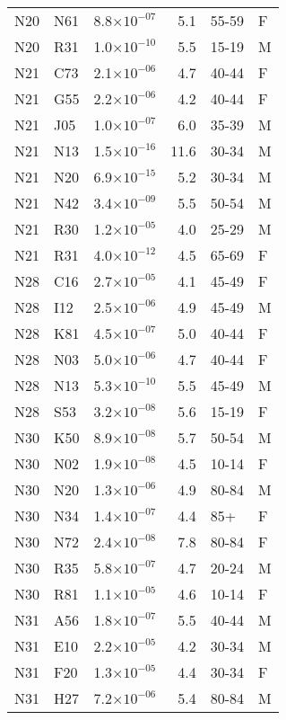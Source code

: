 \begin{longtable}{lllrll}
   N20 & N61 & 8.8$\times10^{-07}$ & 5.1 & 55-59 & F \\ 
   N20 & R31 & 1.0$\times10^{-10}$ & 5.5 & 15-19 & M \\ 
   N21 & C73 & 2.1$\times10^{-06}$ & 4.7 & 40-44 & F \\ 
   N21 & G55 & 2.2$\times10^{-06}$ & 4.2 & 40-44 & F \\ 
   N21 & J05 & 1.0$\times10^{-07}$ & 6.0 & 35-39 & M \\ 
   N21 & N13 & 1.5$\times10^{-16}$ & 11.6 & 30-34 & M \\ 
   N21 & N20 & 6.9$\times10^{-15}$ & 5.2 & 30-34 & M \\ 
   N21 & N42 & 3.4$\times10^{-09}$ & 5.5 & 50-54 & M \\ 
   N21 & R30 & 1.2$\times10^{-05}$ & 4.0 & 25-29 & M \\ 
   N21 & R31 & 4.0$\times10^{-12}$ & 4.5 & 65-69 & F \\ 
   N28 & C16 & 2.7$\times10^{-05}$ & 4.1 & 45-49 & F \\ 
   N28 & I12 & 2.5$\times10^{-06}$ & 4.9 & 45-49 & M \\ 
   N28 & K81 & 4.5$\times10^{-07}$ & 5.0 & 40-44 & F \\ 
   N28 & N03 & 5.0$\times10^{-06}$ & 4.7 & 40-44 & F \\ 
   N28 & N13 & 5.3$\times10^{-10}$ & 5.5 & 45-49 & M \\ 
   N28 & S53 & 3.2$\times10^{-08}$ & 5.6 & 15-19 & F \\ 
   N30 & K50 & 8.9$\times10^{-08}$ & 5.7 & 50-54 & M \\ 
   N30 & N02 & 1.9$\times10^{-08}$ & 4.5 & 10-14 & F \\ 
   N30 & N20 & 1.3$\times10^{-06}$ & 4.9 & 80-84 & M \\ 
   N30 & N34 & 1.4$\times10^{-07}$ & 4.4 & 85+ & F \\ 
   N30 & N72 & 2.4$\times10^{-08}$ & 7.8 & 80-84 & F \\ 
   N30 & R35 & 5.8$\times10^{-07}$ & 4.7 & 20-24 & M \\ 
   N30 & R81 & 1.1$\times10^{-05}$ & 4.6 & 10-14 & F \\ 
   N31 & A56 & 1.8$\times10^{-07}$ & 5.5 & 40-44 & M \\ 
   N31 & E10 & 2.2$\times10^{-05}$ & 4.2 & 30-34 & M \\ 
   N31 & F20 & 1.3$\times10^{-05}$ & 4.4 & 30-34 & F \\ 
   N31 & H27 & 7.2$\times10^{-06}$ & 5.4 & 80-84 & M \\ 

\end{longtable}
